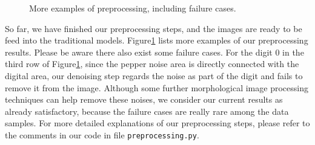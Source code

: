 \documentclass{article}
\begin{document}
\begin{figure}[!htb]

	\caption{More examples of preprocessing, including failure cases.}\label{fig:moreexample}
\end{figure}

So far, we have finished our preprocessing steps, and the images are ready to be feed into the traditional models. Figure\ref{fig:moreexample} lists more examples of our preprocessing results. Please be aware there also exist some failure cases. For the digit 0 in the third row of Figure\ref{fig:moreexample}, since the pepper noise area is directly connected with the digital area, our denoising step regards the noise as part of the digit and fails to remove it from the image. Although some further morphological image processing techniques can help remove these noises, we consider our current results as already satisfactory, because the failure cases are really rare among the data samples. For more detailed explanations of our preprocessing steps, please refer to the comments in our code in file \texttt{preprocessing.py}.
\end{document}
